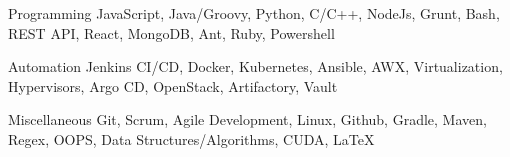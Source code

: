 

\begin{cvskills}

  \cvskill
    {Programming} %
    {JavaScript, Java/Groovy, Python, C/C++, NodeJs, Grunt, Bash, REST API, React, MongoDB, Ant, Ruby, Powershell} %

  \cvskill
    {Automation} %
    {Jenkins CI/CD, Docker, Kubernetes, Ansible, AWX, Virtualization, Hypervisors, Argo CD, OpenStack, Artifactory, Vault} %

  \cvskill
    {Miscellaneous} %
    {Git, Scrum, Agile Development, Linux, Github, Gradle, Maven, Regex, OOPS, Data Structures/Algorithms, CUDA, \LaTeX} %

\end{cvskills}
